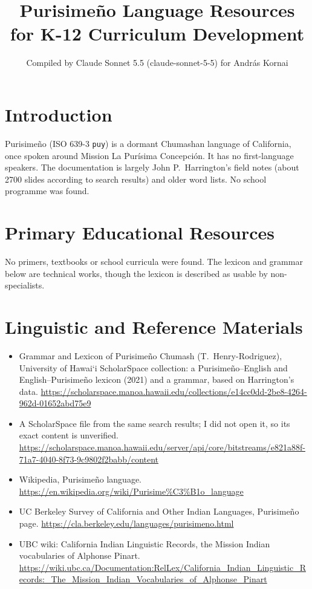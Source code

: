 \documentclass[12pt]{article}
\title{Purisime\~no Language Resources for K-12 Curriculum Development}
\author{Compiled by Claude Sonnet 5.5 (claude-sonnet-5-5) for Andr\'as Kornai}
\date{}
\begin{document}
\maketitle

\section{Introduction}
Purisime\~no (ISO 639-3 \texttt{puy}) is a dormant Chumashan language of California, once spoken around Mission La Pur\'isima Concepci\'on. It has no first-language speakers. The documentation is largely John P.\ Harrington's field notes (about 2700 slides according to search results) and older word lists. No school programme was found.

\section{Primary Educational Resources}
No primers, textbooks or school curricula were found. The lexicon and grammar below are technical works, though the lexicon is described as usable by non-specialists.

\section{Linguistic and Reference Materials}
\begin{itemize}
\item Grammar and Lexicon of Purisime\~no Chumash (T.\ Henry-Rodriguez), University of Hawai\textquoteleft i ScholarSpace collection: a Purisime\~no--English and English--Purisime\~no lexicon (2021) and a grammar, based on Harrington's data. \url{https://scholarspace.manoa.hawaii.edu/collections/e14cc0dd-2be8-4264-962d-01652abd75e9}
\item A ScholarSpace file from the same search results; I did not open it, so its exact content is unverified. \url{https://scholarspace.manoa.hawaii.edu/server/api/core/bitstreams/e821a88f-71a7-4040-8f73-9c9802f2babb/content}
\item Wikipedia, Purisime\~no language. \url{https://en.wikipedia.org/wiki/Purisime%C3%B1o_language}
\item UC Berkeley Survey of California and Other Indian Languages, Purisime\~no page. \url{https://cla.berkeley.edu/languages/purisimeno.html}
\item UBC wiki: California Indian Linguistic Records, the Mission Indian vocabularies of Alphonse Pinart. \url{https://wiki.ubc.ca/Documentation:RelLex/California_Indian_Linguistic_Records:_The_Mission_Indian_Vocabularies_of_Alphonse_Pinart}
\end{itemize}
\end{document}
